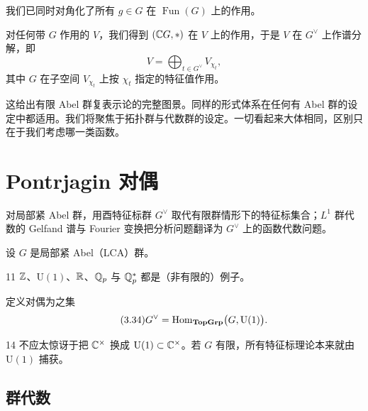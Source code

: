 我们已同时对角化了所有 $g\in G$ 在 $\operatorname{Fun}(G)$ 上的作用。

对任何带 $G$ 作用的 $V$，我们得到 $(\mathbb{C} G,\ast)$ 在 $V$ 上的作用，于是 $V$ 在 $G^{\vee}$ 上作谱分解，即
\begin{equation}\tag{3.33}
V=\bigoplus_{t\in G^{\vee}}V_{\chi_t},
\end{equation}
其中 $G$ 在子空间 $V_{\chi_t}$ 上按 $\chi_t$ 指定的特征值作用。

这给出有限 Abel 群复表示论的完整图景。同样的形式体系在任何有 Abel 群的设定中都适用。我们将聚焦于拓扑群与代数群的设定。一切看起来大体相同，区别只在于我们考虑哪一类函数。

\section{Pontrjagin 对偶}

\begin{sectionkey}
对局部紧 Abel 群，用酉特征标群 $G^{\vee}$ 取代有限群情形下的特征标集合；$L^1$ 群代数的 Gelfand 谱与 Fourier 变换把分析问题翻译为 $G^{\vee}$ 上的函数代数问题。
\end{sectionkey}

设 $G$ 是局部紧 Abel（LCA）群。

\begin{srcex}{11}
$\mathbb{Z}$、$\mathrm{U}(1)$、$\mathbb{R}$、$\mathbb{Q}_p$ 与 $\mathbb{Q}_p^{*}$ 都是（非有限的）例子。
\end{srcex}

定义对偶为之集
\begin{equation}\tag{3.34}
G^{\vee}=\mathrm{Hom}_{\mathbf{TopGrp}}\bigl(G,\mathrm{U}(1)\bigr).
\end{equation}

\begin{srcrem}{14}
不应太惊讶于把 $\mathbb{C}^{\times}$ 换成 $\mathrm{U}(1)\subset\mathbb{C}^{\times}$。若 $G$ 有限，所有特征标理论本来就由 $\mathrm{U}(1)$ 捕获。
\end{srcrem}

\subsection{群代数}

